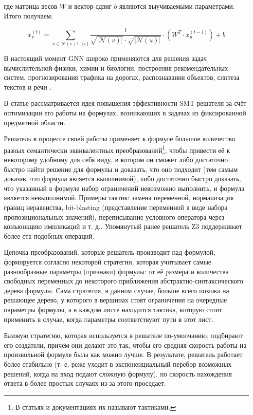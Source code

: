 \noindent где матрица весов $W$ и вектор-сдвиг $b$ являются выучиваемыми параметрами. Итого получаем:

\begin{equation}
    x_v^{(t)} = \sum \limits_{u \in \mathcal{N}(v) \cup \{v\}} \dfrac{1}{\sqrt{|\mathcal{N}(v)|} \cdot \sqrt{|\mathcal{N}(u)|}} \cdot \left(W^T \cdot x_u^{(t - 1)} \right) + b
\end{equation}

В настоящий момент GNN широко применяются для решения задач вычислительной физики, химии и биологии, построения рекомендательных систем, прогнозирования трафика на дорогах, распознавания объектов, синтеза текстов и речи \cite{gnn-global-overview} \cite{gnn-deep-learning-5g}.


В статье \cite{fastsmt-paper} рассматривается идея повышения эффективности SMT-решателя за счёт оптимизации его работы на формулах, возникающих в задачах из фиксированной предметной области.

Решатель в процессе своей работы применяет к формуле большое количество разных семантически эквивалентных преобразований\footnote{В статьях и документациях их называют тактиками.}, чтобы привести её к некоторому удобному для себя виду, в котором он сможет либо достаточно быстро найти решение для формулы и доказать, что оно подходит (тем самым доказав, что формула является выполнимой), либо достаточно быстро доказать, что указанный в формуле набор ограничений невозможно выполнить, и формула является невыполнимой. Примеры тактик: замена переменной, нормализация границ неравенства, bit-blasting (представление переменной в виде набора пропозициональных значений), переписывание условного оператора через конъюнкцию импликаций и т. д.. Упомянутый ранее решатель Z3 \cite{z3-paper} поддерживает более ста подобных операций.

Цепочка преобразований, которые решатель производит над формулой, формируется согласно некоторой стратегии, которая учитывает самые разнообразные параметры (признаки) формулы: от её размера и количества свободных переменных до некоторого приближения абстрактно-синтаксического дерева формулы. Сама стратегия, в данном случае, больше всего похожа на решающее дерево, у которого в вершинах стоят ограничения на очередные параметры формулы, а в каждом листе находится тактика, которую стоит применить в случае, когда параметры соответствуют пути в этот лист.

Базовую стратегию, которая используется в решателе по-умолчанию, подбирают его создатели, причём они делают это так, чтобы его средняя скорость работы на произвольной формуле была как можно лучше. В результате, решатель работает более стабильно (т. е. реже уходит в экспоненциальный перебор возможных решений, когда на вход подают сложную формулу), но скорость нахождения ответа в более простых случаях из-за этого проседает.

